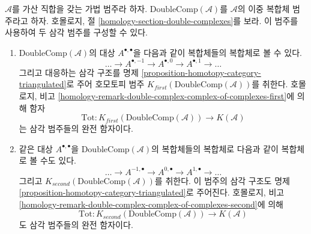 \begin{remark}
\label{remark-homotopy-double}
$\mathcal{A}$를 가산 직합을 갖는 가법 범주라 하자.
$\text{DoubleComp}(\mathcal{A})$를 $\mathcal{A}$의 이중 복합체
범주라고 하자. 호몰로지, 절
\ref{homology-section-double-complexes}를 보라. 이 범주를 사용하여
두 삼각 범주를 구성할 수 있다.
\begin{enumerate}
\item $\text{DoubleComp}(\mathcal{A})$의 대상
$A^{\bullet, \bullet}$을 다음과 같이 복합체들의 복합체로 볼 수 있다.
$$
\ldots \to A^{\bullet, -1} \to A^{\bullet, 0} \to A^{\bullet, 1} \to \ldots
$$
그리고 대응하는 삼각 구조를 명제
\ref{proposition-homotopy-category-triangulated}로 주어
호모토피 범주 $K_{first}(\text{DoubleComp}(\mathcal{A}))$를 취한다.
호몰로지, 비고
\ref{homology-remark-double-complex-complex-of-complexes-first}에
의해 함자
$$
\text{Tot} :
K_{first}(\text{DoubleComp}(\mathcal{A}))
\longrightarrow
K(\mathcal{A})
$$
는 삼각 범주들의 완전 함자이다.
\item 같은 대상 $A^{\bullet, \bullet}$을
$\text{DoubleComp}(\mathcal{A})$의 복합체들의 복합체로 다음과 같이
복합체로 볼 수도 있다.
$$
\ldots \to A^{-1, \bullet} \to A^{0, \bullet} \to A^{1, \bullet} \to \ldots
$$
그리고 $K_{second}(\text{DoubleComp}(\mathcal{A}))$를 취한다.
이 범주의 삼각 구조도 명제
\ref{proposition-homotopy-category-triangulated}로 주어진다.
호몰로지, 비고
\ref{homology-remark-double-complex-complex-of-complexes-second}에
의해
$$
\text{Tot} :
K_{second}(\text{DoubleComp}(\mathcal{A}))
\longrightarrow
K(\mathcal{A})
$$
도 삼각 범주들의 완전 함자이다.
\end{enumerate}
\end{remark}

